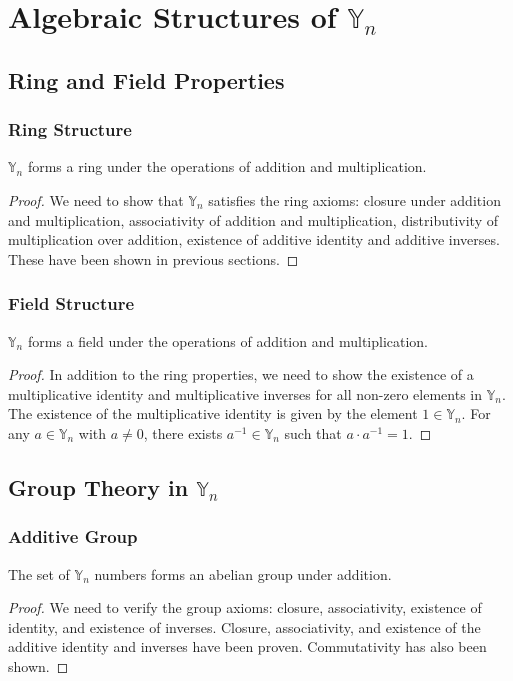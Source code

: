 \documentclass[12pt]{book}
\begin{document}
\chapter{Algebraic Structures of $\mathbb{Y}_n$}
\section{Ring and Field Properties}
\subsection{Ring Structure}
\begin{theorem}
$\mathbb{Y}_n$ forms a ring under the operations of addition and multiplication.
\end{theorem}
\begin{proof}
We need to show that $\mathbb{Y}_n$ satisfies the ring axioms: closure under addition and multiplication, associativity of addition and multiplication, distributivity of multiplication over addition, existence of additive identity and additive inverses. These have been shown in previous sections.
\end{proof}

\subsection{Field Structure}
\begin{theorem}
$\mathbb{Y}_n$ forms a field under the operations of addition and multiplication.
\end{theorem}
\begin{proof}
In addition to the ring properties, we need to show the existence of a multiplicative identity and multiplicative inverses for all non-zero elements in $\mathbb{Y}_n$. The existence of the multiplicative identity is given by the element $1 \in \mathbb{Y}_n$. For any $a \in \mathbb{Y}_n$ with $a \neq 0$, there exists $a^{-1} \in \mathbb{Y}_n$ such that $a \cdot a^{-1} = 1$.
\end{proof}

\section{Group Theory in $\mathbb{Y}_n$}
\subsection{Additive Group}
\begin{theorem}
The set of $\mathbb{Y}_n$ numbers forms an abelian group under addition.
\end{theorem}
\begin{proof}
We need to verify the group axioms: closure, associativity, existence of identity, and existence of inverses. Closure, associativity, and existence of the additive identity and inverses have been proven. Commutativity has also been shown.
\end{proof}
\end{document}
